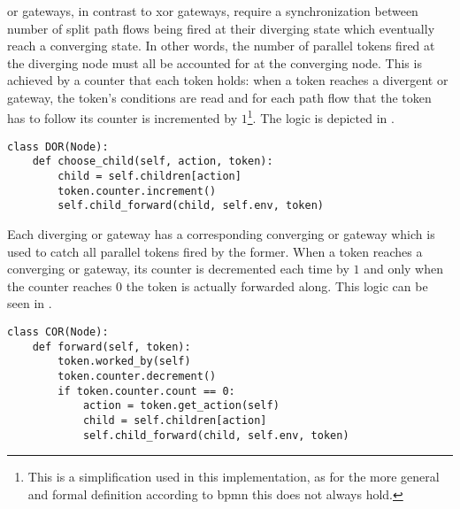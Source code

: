 \subsubsection{}

\gls{or} gateways, in contrast to \gls{xor} gateways, require a synchronization between number of split path flows being fired at their diverging state which eventually reach a converging state. In other words, the number of parallel tokens fired at the diverging node must all be accounted for at the converging node. This is achieved by a counter that each token holds: when a token reaches a divergent \gls{or} gateway, the token's conditions are read and for each path flow that the token has to follow its counter is incremented by $1$\footnote{This is a simplification used in this implementation, as for the more general and formal definition according to \gls{bpmn} this does not always hold.}. The logic is depicted in .

\begin{lstlisting}[caption=Token's counter increment logic at a divergent \glsentryshort{or} gateway in which the corresponding counter object is incremeted by $1$ at each method's call.,label=lst:or_counter_increment,style=CustomPython]
class DOR(Node):
    def choose_child(self, action, token):
        child = self.children[action]
        token.counter.increment()
        self.child_forward(child, self.env, token)
\end{lstlisting}

Each diverging \gls{or} gateway has a corresponding converging \gls{or} gateway which is used to catch all parallel tokens fired by the former. When a token reaches a converging \gls{or} gateway, its counter is decremented each time by $1$ and only when the counter reaches $0$ the token is actually forwarded along. This logic can be seen in .

\begin{lstlisting}[caption=Token's counter decrement logic at a convergent \glsentryshort{or} gateway in which the corresponding counter object is decremented by $1$ at each method's call.,label=lst:or_counter_decrement,style=CustomPython]
class COR(Node):
    def forward(self, token):
        token.worked_by(self)
        token.counter.decrement()
        if token.counter.count == 0:
            action = token.get_action(self)
            child = self.children[action]
            self.child_forward(child, self.env, token)
\end{lstlisting}

